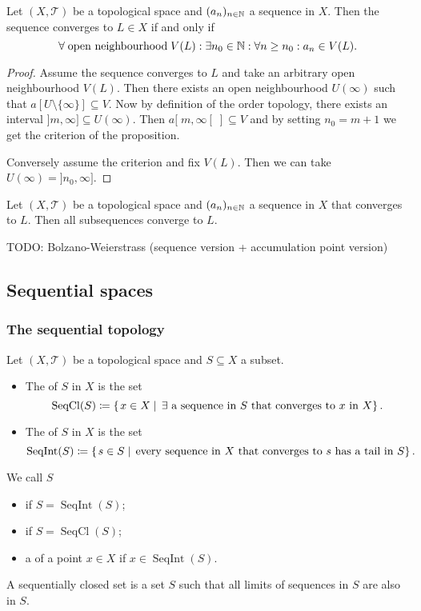 \begin{proposition} \label{sequenceConvergence}
Let $(X,\mathcal{T})$ be a topological space and $(a_n)_{n\in\mathbb{N}}$ a sequence in $X$. Then the sequence converges to $L\in X$ \textup{if and only if}
\[ \forall \;\text{open neighbourhood}\; V(L): \exists n_0\in \mathbb{N}: \forall n\geq n_0: a_n\in V(L). \]
\end{proposition}
\begin{proof}
Assume the sequence converges to $L$ and take an arbitrary open neighbourhood $V(L)$. Then there exists an open neighbourhood $U(\infty)$ such that $a[U\setminus\{\infty\}] \subseteq V$. Now by definition of the order topology, there exists an interval $]m, \infty]\subseteq U(\infty)$. Then $a[\;m, \infty[\;] \subseteq V$ and by setting $n_0=m+1$ we get the criterion of the proposition.

Conversely assume the criterion and fix $V(L)$. Then we can take $U(\infty)=]n_0, \infty]$.
\end{proof}

\begin{lemma} \label{subsequencesConverge}
Let $(X,\mathcal{T})$ be a topological space and $(a_n)_{n\in\mathbb{N}}$ a sequence in $X$ that converges to $L$. Then all subsequences converge to $L$.
\end{lemma}

TODO: Bolzano-Weierstrass (sequence version + accumulation point version)

\subsection{Sequential spaces}
\subsubsection{The sequential topology}
\begin{definition}
Let $(X,\mathcal{T})$ be a topological space and $S\subseteq X$ a subset.
\begin{itemize}
\item The  of $S$ in $X$ is the set
\[ \operatorname{SeqCl}(S) \coloneqq \left\{\left. x\in X \;\right|\; \text{$\exists$ a sequence in $S$ that converges to $x$ in $X$} \right\}. \]
\item The  of $S$ in $X$ is the set
\[ \operatorname{SeqInt}(S) \coloneqq \left\{\left. s\in S \;\right|\; \text{every sequence in $X$ that converges to $s$ has a tail in $S$} \right\}. \]
\end{itemize}
We call $S$
\begin{itemize}
\item {} if $S = \operatorname{SeqInt}(S)$;
\item {} if $S = \operatorname{SeqCl}(S)$;
\item a  of a point $x\in X$ if $x\in \operatorname{SeqInt}(S)$.
\end{itemize}
\end{definition}
A sequentially closed set is a set $S$ such that all limits of sequences in $S$ are also in $S$.

